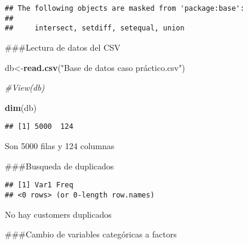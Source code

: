\documentclass[
]{article}
\newenvironment{Shaded}{\begin{snugshade}}{\end{snugshade}}
\newcommand{\CommentTok}[1]{\textcolor[rgb]{0.56,0.35,0.01}{\textit{#1}}}
\newcommand{\DecValTok}[1]{\textcolor[rgb]{0.00,0.00,0.81}{#1}}
\newcommand{\KeywordTok}[1]{\textcolor[rgb]{0.13,0.29,0.53}{\textbf{#1}}}
\newcommand{\NormalTok}[1]{#1}
\newcommand{\OperatorTok}[1]{\textcolor[rgb]{0.81,0.36,0.00}{\textbf{#1}}}
\newcommand{\StringTok}[1]{\textcolor[rgb]{0.31,0.60,0.02}{#1}}
\begin{document}
\begin{verbatim}
## The following objects are masked from 'package:base':
## 
##     intersect, setdiff, setequal, union
\end{verbatim}

\#\#\#Lectura de datos del CSV

\begin{Shaded}
\begin{Highlighting}[]
\NormalTok{db<-}\KeywordTok{read.csv}\NormalTok{(}\StringTok{"Base de datos caso práctico.csv"}\NormalTok{)}

\CommentTok{#View(db)}

\KeywordTok{dim}\NormalTok{(db)}
\end{Highlighting}
\end{Shaded}

\begin{verbatim}
## [1] 5000  124
\end{verbatim}

Son 5000 filas y 124 columnas

\#\#\#Busqueda de duplicados

\begin{Shaded}
\end{Shaded}

\begin{verbatim}
## [1] Var1 Freq
## <0 rows> (or 0-length row.names)
\end{verbatim}

No hay customers duplicados

\#\#\#Cambio de variables categóricas a factors
\end{document}
